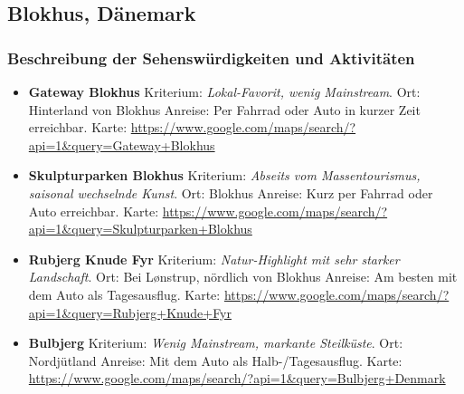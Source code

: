 \documentclass[a4paper,12pt]{article}
\begin{document}
\subsection{Blokhus, Dänemark}


\subsubsection{Beschreibung der Sehenswürdigkeiten und Aktivitäten}
\begin{itemize}
\item \textbf{Gateway Blokhus}\newline
Kriterium: \textit{Lokal-Favorit, wenig Mainstream}.\newline
Ort: Hinterland von Blokhus\newline
Anreise: Per Fahrrad oder Auto in kurzer Zeit erreichbar.\newline
Karte: \url{https://www.google.com/maps/search/?api=1&query=Gateway+Blokhus}

\item \textbf{Skulpturparken Blokhus}\newline
Kriterium: \textit{Abseits vom Massentourismus, saisonal wechselnde Kunst}.\newline
Ort: Blokhus\newline
Anreise: Kurz per Fahrrad oder Auto erreichbar.\newline
Karte: \url{https://www.google.com/maps/search/?api=1&query=Skulpturparken+Blokhus}

\item \textbf{Rubjerg Knude Fyr}\newline
Kriterium: \textit{Natur-Highlight mit sehr starker Landschaft}.\newline
Ort: Bei Lønstrup, nördlich von Blokhus\newline
Anreise: Am besten mit dem Auto als Tagesausflug.\newline
Karte: \url{https://www.google.com/maps/search/?api=1&query=Rubjerg+Knude+Fyr}

\item \textbf{Bulbjerg}\newline
Kriterium: \textit{Wenig Mainstream, markante Steilküste}.\newline
Ort: Nordjütland\newline
Anreise: Mit dem Auto als Halb-/Tagesausflug.\newline
Karte: \url{https://www.google.com/maps/search/?api=1&query=Bulbjerg+Denmark}


\end{itemize}
\end{document}
